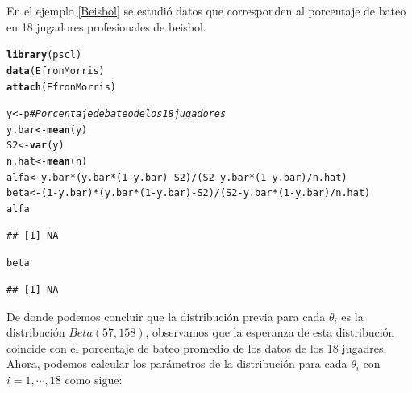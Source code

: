\documentclass[10pt,openright]{book}\usepackage[]{graphicx}\usepackage[]{color}
\makeatletter
\newcommand{\hlnum}[1]{\textcolor[rgb]{0.686,0.059,0.569}{#1}}%
\newcommand{\hlcom}[1]{\textcolor[rgb]{0.678,0.584,0.686}{\textit{#1}}}%
\newcommand{\hlopt}[1]{\textcolor[rgb]{0,0,0}{#1}}%
\newcommand{\hlstd}[1]{\textcolor[rgb]{0.345,0.345,0.345}{#1}}%
\newcommand{\hlkwb}[1]{\textcolor[rgb]{0.69,0.353,0.396}{#1}}%
\newcommand{\hlkwd}[1]{\textcolor[rgb]{0.737,0.353,0.396}{\textbf{#1}}}%
\newenvironment{kframe}{%
 \def\at@end@of@kframe{}%
 \ifinner\ifhmode%
  \def\at@end@of@kframe{\end{minipage}}%
  \begin{minipage}{\columnwidth}%
 \fi\fi%
 \def\FrameCommand##1{\hskip\@totalleftmargin \hskip-\fboxsep
 \colorbox{shadecolor}{##1}\hskip-\fboxsep
     \hskip-\linewidth \hskip-\@totalleftmargin \hskip\columnwidth}%
 \MakeFramed {\advance\hsize-\width
   \@totalleftmargin\z@ \linewidth\hsize
   \@setminipage}}%
 {\par\unskip\endMakeFramed%
 \at@end@of@kframe}
\newenvironment{knitrout}{}{} %
\makeatother
\begin{document}
\begin{Eje}\label{Beisbol_jerarquico}
En el ejemplo \ref{Beisbol} se estudi\'o datos que corresponden al porcentaje de bateo en 18 jugadores profesionales de beisbol. 
\begin{knitrout}
\color{fgcolor}\begin{kframe}
\begin{alltt}
\hlkwd{library}\hlstd{(pscl)}
\hlkwd{data}\hlstd{(EfronMorris)}
\hlkwd{attach}\hlstd{(EfronMorris)}
\end{alltt}


{\ttfamily\noindent\itshape\color{messagecolor}{\#\# The following objects are masked \_by\_ .GlobalEnv:\\\#\# \\\#\#\ \ \ \  n, p, y}}\begin{alltt}
\hlstd{y} \hlkwb{<-} \hlstd{p} \hlcom{# Porcentaje de bateo de los 18 jugadores}
\hlstd{y.bar} \hlkwb{<-} \hlkwd{mean}\hlstd{(y)}
\hlstd{S2} \hlkwb{<-} \hlkwd{var}\hlstd{(y)}
\hlstd{n.hat} \hlkwb{<-} \hlkwd{mean}\hlstd{(n)}
\hlstd{alfa} \hlkwb{<-} \hlstd{y.bar}\hlopt{*}\hlstd{(y.bar}\hlopt{*}\hlstd{(}\hlnum{1}\hlopt{-}\hlstd{y.bar)}\hlopt{-}\hlstd{S2)}\hlopt{/}\hlstd{(S2}\hlopt{-}\hlstd{y.bar}\hlopt{*}\hlstd{(}\hlnum{1}\hlopt{-}\hlstd{y.bar)}\hlopt{/}\hlstd{n.hat)}
\hlstd{beta} \hlkwb{<-} \hlstd{(}\hlnum{1}\hlopt{-}\hlstd{y.bar)}\hlopt{*}\hlstd{(y.bar}\hlopt{*}\hlstd{(}\hlnum{1}\hlopt{-}\hlstd{y.bar)}\hlopt{-}\hlstd{S2)}\hlopt{/}\hlstd{(S2}\hlopt{-}\hlstd{y.bar}\hlopt{*}\hlstd{(}\hlnum{1}\hlopt{-}\hlstd{y.bar)}\hlopt{/}\hlstd{n.hat)}
\hlstd{alfa}
\end{alltt}
\begin{verbatim}
## [1] NA
\end{verbatim}
\begin{alltt}
\hlstd{beta}
\end{alltt}
\begin{verbatim}
## [1] NA
\end{verbatim}
\end{kframe}
\end{knitrout}
De donde podemos concluir que la distribuci\'on previa para cada $\theta_i$ es la distribuci\'on $Beta(57, 158)$, observamos que la esperanza de esta distribuci\'on coincide con el porcentaje de bateo promedio de los datos de los 18 jugadres. Ahora, podemos calcular los par\'ametros de la distribuci\'on para cada $\theta_i$ con $i=1,\cdots,18$ como sigue:
\begin{knitrout}
\color{fgcolor}\begin{kframe}

\end{kframe}
\end{knitrout}
\end{Eje}
\end{document}

